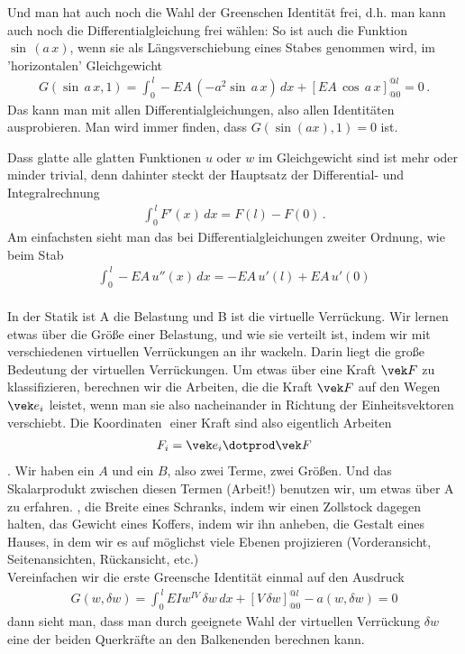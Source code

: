 Und man hat auch noch die Wahl der Greenschen Identit\"{a}t frei, d.h. man kann auch noch die Differentialgleichung frei w\"{a}hlen: So ist auch die Funktion $\sin\,(a\,x) $, wenn sie als L\"{a}ngsverschiebung eines Stabes genommen wird, im 'horizontalen' Gleichgewicht
\begin{align}
G(\sin\,a\,x,1) = \int_0^{\,l} - EA\,(- a^2\sin\,a\,x)\,dx + [EA\,\cos\,a\,x]_{@0}^{@l} = 0\,.
\end{align}
Das kann man mit allen Differentialgleichungen, also allen Identit\"{a}ten ausprobieren. Man wird immer finden, dass $G(\sin (ax), 1) = 0 $ ist.


Dass glatte alle glatten Funktionen $u$ oder $w$ im Gleichgewicht sind ist mehr oder minder trivial, denn dahinter steckt der Hauptsatz der Differential- und Integralrechnung
\begin{align}
\int_0^{\,l} F'(x)\,dx = F(l) - F(0)\,.
\end{align}
Am einfachsten sieht man das bei Differentialgleichungen zweiter Ordnung, wie beim Stab
\begin{align}
\int_0^{\,l} - EA\,u''(x)\,dx = - EA\,u'(l) + EA\,u'(0)
\end{align}
\\

In der Statik ist A die Belastung und B ist die virtuelle Verr\"{u}ckung. Wir lernen etwas \"{u}ber die Gr\"{o}{\ss}e einer Belastung, und wie sie verteilt ist, indem wir mit verschiedenen virtuellen Verr\"{u}ckungen an ihr wackeln. Darin liegt die gro{\ss}e Bedeutung der virtuellen Verr\"{u}ckungen. Um etwas \"{u}ber eine Kraft $\vek F$ zu klassifizieren, berechnen wir die Arbeiten, die die Kraft $\vek F $ auf den Wegen $\vek e_i $ leistet, wenn man sie also nacheinander in Richtung der Einheitsvektoren verschiebt. Die Koordinaten $ $ einer Kraft sind also eigentlich Arbeiten
\begin{align}
F_i = \vek e_i \dotprod \vek F
\end{align}
. Wir haben ein $A$ und ein $B$, also zwei Terme, zwei Gr\"{o}{\ss}en. Und das Skalarprodukt zwischen diesen Termen (Arbeit!) benutzen wir, um etwas \"{u}ber A zu erfahren.
, die Breite eines Schranks, indem wir einen Zollstock dagegen halten, das Gewicht eines Koffers, indem wir ihn anheben, die Gestalt eines Hauses, in dem wir es auf m\"{o}glichst viele Ebenen projizieren (Vorderansicht, Seitenansichten, R\"{u}ckansicht, etc.)
\\

Vereinfachen wir die erste Greensche Identit\"{a}t einmal auf den Ausdruck
\begin{align}
G(w, \delta w) = \int_0^{\,l} EI w^{IV}\,\delta w\,dx + [V\,\delta w]_{@0}^{@l} - a(w, \delta w) = 0
\end{align}
dann sieht man, dass man durch  geeignete Wahl der virtuellen Verr\"{u}ckung $\delta w$ eine der beiden Querkr\"{a}fte an den Balkenenden berechnen kann.

